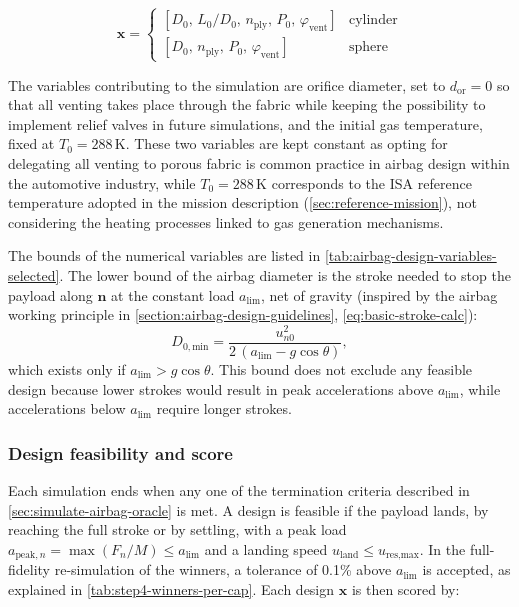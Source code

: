 \begin{equation}\label{eq:design-variables}
  \mathbf{x} =
  \begin{cases}
    [D_0,\, L_0/D_0,\, n_\text{ply},\, P_0,\, \varphi_\text{vent}] & \text{cylinder} \\
    [D_0,\, n_\text{ply},\, P_0,\, \varphi_\text{vent}] & \text{sphere}
  \end{cases}
\end{equation}

The variables contributing to the simulation are orifice diameter, set to $d_\text{or} = 0$ so that all venting takes place through the fabric while keeping the possibility to implement relief valves in future simulations, and the initial gas temperature, fixed at $T_0 = 288$\,K. These two variables are kept constant as opting for delegating all venting to porous fabric is common practice in airbag design within the automotive industry, while $T_0 = 288$\,K corresponds to the ISA reference temperature adopted in the mission description (\cref{sec:reference-mission}), not considering the heating processes linked to gas generation mechanisms.

The bounds of the numerical variables are listed in \cref{tab:airbag-design-variables-selected}. The lower bound of the airbag diameter is the stroke needed to stop the payload along $\mathbf{n}$ at the constant load $a_\text{lim}$, net of gravity (inspired by the airbag working principle in \cref{section:airbag-design-guidelines}, \cref{eq:basic-stroke-calc}):
\begin{equation}\label{eq:min_stroke}
  D_{0,\text{min}} = \frac{u_{n0}^2}{2\,(a_\text{lim} - g\cos\theta)},
\end{equation}
which exists only if $a_\text{lim} > g\cos\theta$. This bound does not exclude any feasible design because lower strokes would result in peak accelerations above $a_\text{lim}$, while accelerations below $a_\text{lim}$ require longer strokes.


\subsubsection{Design feasibility and score}
Each simulation ends when any one of the termination criteria described in \cref{sec:simulate-airbag-oracle} is met. A design is feasible if the payload lands, by reaching the full stroke or by settling, with a peak load $a_{\text{peak},n} = \max(F_n/M) \le a_\text{lim}$ and a landing speed $u_\text{land} \le u_\text{res,max}$. In the full-fidelity re-simulation of the winners, a tolerance of 0.1\% above $a_\text{lim}$ is accepted, as explained in \cref{tab:step4-winners-per-cap}. Each design $\mathbf{x}$ is then scored by:

